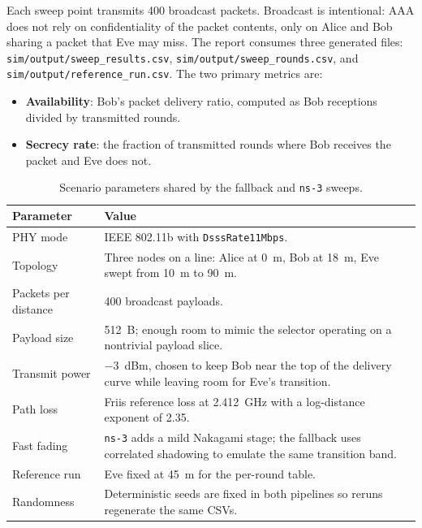 \documentclass[11pt]{article}
\newcommand{\BobDistanceMeters}{18}
\newcommand{\ReferenceDistanceMeters}{45}
\newcommand{\SweepRounds}{400}
\begin{document}
Each sweep point transmits \SweepRounds{} broadcast packets. Broadcast is intentional: AAA does not rely on confidentiality of the packet contents, only on Alice and Bob sharing a packet that Eve may miss. The report consumes three generated files:
\texttt{sim/output/sweep\_results.csv},
\texttt{sim/output/sweep\_rounds.csv}, and
\texttt{sim/output/reference\_run.csv}. The two primary metrics are:
\begin{itemize}
\item \textbf{Availability}: Bob's packet delivery ratio, computed as Bob receptions divided by transmitted rounds.
\item \textbf{Secrecy rate}: the fraction of transmitted rounds where Bob receives the packet and Eve does not.
\end{itemize}

\begin{table}[t]
\centering
\caption{Scenario parameters shared by the fallback and \texttt{ns-3} sweeps.}
\begin{tabularx}{\linewidth}{>{\ttfamily}l Y}
\toprule
Parameter & Value \\
\midrule
PHY mode & IEEE 802.11b with \texttt{DsssRate11Mbps}. \\
Topology & Three nodes on a line: Alice at \SI{0}{m}, Bob at \SI{\BobDistanceMeters}{m}, Eve swept from \SI{10}{m} to \SI{90}{m}. \\
Packets per distance & \SweepRounds{} broadcast payloads. \\
Payload size & \SI{512}{B}; enough room to mimic the selector operating on a nontrivial payload slice. \\
Transmit power & \SI{-3}{dBm}, chosen to keep Bob near the top of the delivery curve while leaving room for Eve's transition. \\
Path loss & Friis reference loss at \SI{2.412}{GHz} with a log-distance exponent of 2.35. \\
Fast fading & \texttt{ns-3} adds a mild Nakagami stage; the fallback uses correlated shadowing to emulate the same transition band. \\
Reference run & Eve fixed at \SI{\ReferenceDistanceMeters}{m} for the per-round table. \\
Randomness & Deterministic seeds are fixed in both pipelines so reruns regenerate the same CSVs. \\
\bottomrule
\end{tabularx}
\end{table}
\end{document}
